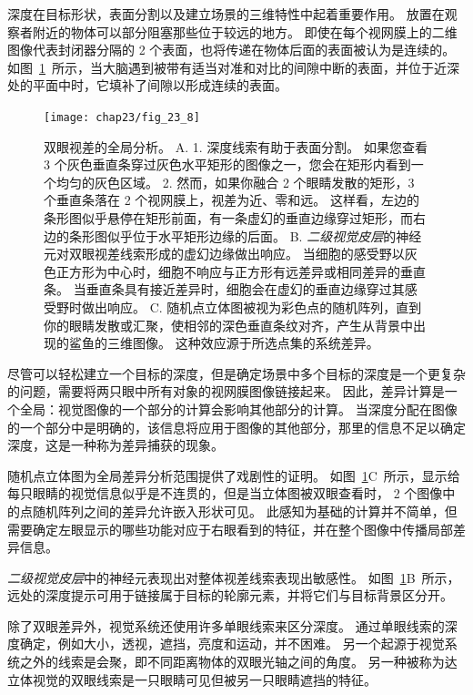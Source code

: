 深度在目标形状，表面分割以及建立场景的三维特性中起着重要作用。
放置在观察者附近的物体可以部分阻塞那些位于较远的地方。
即使在每个视网膜上的二维图像代表封闭器分隔的 2 个表面，也将传递在物体后面的表面被认为是连续的。
如图~\ref{fig:23_8}~所示，当大脑遇到被带有适当对准和对比的间隙中断的表面，并位于近深处的平面中时，它填补了间隙以形成连续的表面。


\begin{figure}[htbp]
	\centering
	\texttt{[image: chap23/fig\_23\_8]}
	\caption{双眼视差的全局分析。
		A. 1. 深度线索有助于表面分割。
		如果您查看 3 个灰色垂直条穿过灰色水平矩形的图像之一，您会在矩形内看到一个均匀的灰色区域。
		2. 然而，如果你融合 2 个眼睛发散的矩形，3 个垂直条落在 2 个视网膜上，视差为近、零和远。
		这样看，左边的条形图似乎悬停在矩形前面，有一条虚幻的垂直边缘穿过矩形，而右边的条形图似乎位于水平矩形边缘的后面。
		B. \textit{二级视觉皮层}的神经元对双眼视差线索形成的虚幻边缘做出响应。
		当细胞的感受野以灰色正方形为中心时，细胞不响应与正方形有远差异或相同差异的垂直条。
		当垂直条具有接近差异时，细胞会在虚幻的垂直边缘穿过其感受野时做出响应\cite{bakin2000visual}。
		C. 随机点立体图被视为彩色点的随机阵列，直到你的眼睛发散或汇聚，使相邻的深色垂直条纹对齐，产生从背景中出现的鲨鱼的三维图像。
		这种效应源于所选点集的系统差异。}
	\label{fig:23_8}
\end{figure}


尽管可以轻松建立一个目标的深度，但是确定场景中多个目标的深度是一个更复杂的问题，需要将两只眼中所有对象的视网膜图像链接起来。
因此，差异计算是一个全局：视觉图像的一个部分的计算会影响其他部分的计算。
当深度分配在图像的一个部分中是明确的，该信息将应用于图像的其他部分，那里的信息不足以确定深度，这是一种称为差异捕获的现象。


随机点立体图为全局差异分析范围提供了戏剧性的证明。
如图~\ref{fig:23_8}C~所示，显示给每只眼睛的视觉信息似乎是不连贯的，但是当立体图被双眼查看时， 2 个图像中的点随机阵列之间的差异允许嵌入形状可见。
此感知为基础的计算并不简单，但需要确定左眼显示的哪些功能对应于右眼看到的特征，并在整个图像中传播局部差异信息。


\textit{二级视觉皮层}中的神经元表现出对整体视差线索表现出敏感性。
如图~\ref{fig:23_8}B~所示，远处的深度提示可用于链接属于目标的轮廓元素，并将它们与目标背景区分开。


除了双眼差异外，视觉系统还使用许多单眼线索来区分深度。
通过单眼线索的深度确定，例如大小，透视，遮挡，亮度和运动，并不困难。
另一个起源于视觉系统之外的线索是会聚，即不同距离物体的双眼光轴之间的角度。
另一种被称为达立体视觉的双眼线索是一只眼睛可见但被另一只眼睛遮挡的特征。


